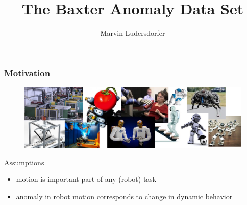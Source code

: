 \documentclass{beamer}
\title{The Baxter Anomaly Data Set}
\author{Marvin Ludersdorfer}
\institute{Technische Universit\"{a}t M\"{u}nchen}
\date{}
\begin{document}
    \frame{\titlepage}

    \begin{frame}
    	\frametitle{Motivation}
        \begin{figure}
            \centering
            \includegraphics[width=\textwidth]{figs/robots}
        \end{figure}
        
        \vfill
        \begin{block}{Assumptions}
            \begin{itemize}
                \item motion is important part of any (robot) task
                \item<2-> anomaly in robot motion corresponds to change in dynamic behavior
            \end{itemize}
    	\end{block}
    \end{frame}
\end{document}
